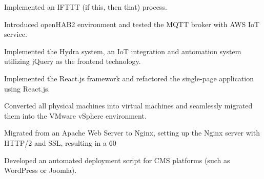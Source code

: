 \documentclass[]{deedy-resume-openfont}
\begin{document}
\begin{minipage}[t]{1\textwidth}
\null\hfill{}
\begin{tightemize}
    \item Implemented an IFTTT (if this, then that) process.
    \item Introduced openHAB2 environment and tested the MQTT broker with AWS IoT service.
\end{tightemize}
\sectionsep

\null\hfill{}
\begin{tightemize}
    \item Implemented the Hydra system, an IoT integration and automation system utilizing jQuery as the frontend technology.
    \item Implemented the React.js framework and refactored the single-page application using React.js.
\end{tightemize}
\sectionsep

\null\hfill{}
\begin{tightemize}
    \item Converted all physical machines into virtual machines and seamlessly migrated them into the VMware vSphere environment.
    \item Migrated from an Apache Web Server to Nginx, setting up the Nginx server with HTTP/2 and SSL, resulting in a 60%
    \item Developed an automated deployment script for CMS platforms (such as WordPress or Joomla).
\end{tightemize}



\end{minipage}
%
%
\end{document}
